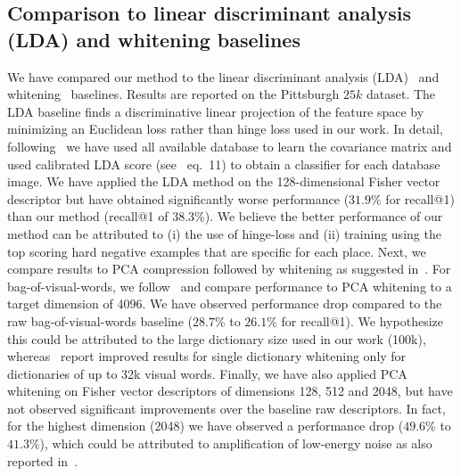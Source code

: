   \subsection{{Comparison to linear discriminant analysis (LDA) and whitening baselines}}
  \label{sec:LDA}
    {
      We have compared our method to the linear discriminant analysis (LDA)~\cite{Aubry13,Hariharan12,Gharbi12} and whitening~\cite{JegouChum12} baselines. Results are reported on the Pittsburgh $25k$ dataset. The LDA baseline finds a discriminative linear projection of the feature space by minimizing an Euclidean loss rather than hinge loss used in our work. In detail, following~\cite{Aubry13} we have used all available database to learn the covariance matrix and used calibrated LDA score (see~\cite{Aubry13} eq.~11) to obtain a classifier for each database image.  
      We have applied the LDA method on the 128-dimensional Fisher vector descriptor but have obtained significantly worse performance ($31.9\%$ for recall@1) than our method (recall@1 of 38.3\%). 
      We believe the better performance of our method can be attributed to (i) the use of hinge-loss and (ii) training using the top scoring hard negative examples that are specific for each place.
    }
    {  
      Next, we compare results to PCA compression followed by whitening as suggested in~\cite{JegouChum12}. For bag-of-visual-words, we follow~\cite{JegouChum12} and compare performance to PCA whitening to a target dimension of 4096. We have observed performance drop compared to the raw bag-of-visual-words baseline ($28.7\%$ to $26.1\%$ for recall@1). We hypothesize this could be attributed to the large dictionary size used in our work (100k), whereas~\cite{JegouChum12} report improved results for single dictionary whitening only for dictionaries of up to 32k visual words.
      Finally,  we have also applied PCA whitening on Fisher vector descriptors of dimensions 128, 512 and 2048, but have not observed significant improvements over the baseline raw descriptors. In fact, for the highest dimension (2048) we have observed a performance drop ($49.6\%$ to $41.3\%$), which could be attributed to amplification of low-energy noise as also reported in~\cite{JegouChum12}. 
    }
%
